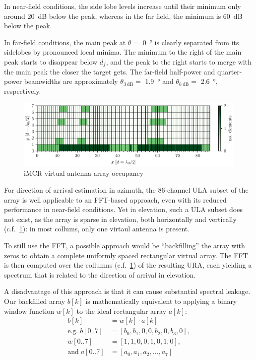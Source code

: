 In near-field conditions, the side lobe levels increase until their minimum only around \SI{20}{\dB} below the peak,
whereas in the far field, the minimum is \SI{60}{\dB} below the peak.

In far-field conditions, the main peak at $\theta =$ \SI{0}{\degree}
is clearly separated from its sidelobes by pronounced local minima.
The minimum to the right of the main peak starts to disappear below $d_f$,
and the peak to the right starts to merge with the main peak the closer the target gets.
The far-field half-power and quarter-power beamwidths are approximately
$\theta_{\SI{3}{\dB}}=$ \SI{1.9}{\degree} and $\theta_{\SI{6}{\dB}}=$ \SI{2.6}{\degree}, respectively. \\
\begin{figure}[h]
    \centering
    \includegraphics[width=\textwidth]{../figures/virt_array.pdf}
    \caption{iMCR virtual antenna array occupancy}
    \label{fig:virt_array}
\end{figure}

For direction of arrival estimation in azimuth, the 86-channel ULA subset of the array is well applicable to an FFT-based approach,
even with its reduced performance in near-field conditions.
Yet in elevation, such a ULA subset does not exist, as the array is sparse in elevation,
both horizontally and vertically (c.f.\ \ref{fig:virt_array}):
in most collums, only one virtaul antenna is present.

To still use the FFT, a possible approach would be ``backfilling'' the array with zeros
to obtain a complete uniformly spaced rectangular virtual array.
The FFT is then computed over the collumns (c.f.\ \ref{fig:virt_array}) of the resulting URA,
each yielding a spectrum that is related to the direction of arrival in elevation.

A disadvantage of this approach is that it can cause substantial spectral leakage.
Our backfilled array $b[k] $ is mathematically equivalent
to applying a binary window function $w[k]$ to the ideal rectangular array $a[k]$:
\begin{align*}
    b[k]                   & =  w[k] \cdot  a[k]             \\
    \text{e.g.}\;  b[0..7] & = [b_0, b_1, 0,0,b_2,0,b_3,0 ], \\
    w[0..7]                & = [1,  1,0,0,1,0,1,0 ],         \\
    \text{and}\; a[0..7]   & = [a_0,a_1,a_2,\dots,a_7]
\end{align*}

